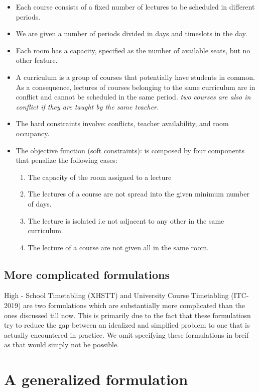 \documentclass[11pt]{book}
\begin{document}
\begin{itemize}

	\item Each course consists of a fixed number of lectures to be scheduled in different periods.
	\item We are given a number of periods divided in days and timeslots in the day. 
	\item Each room has a capacity, specified as the number of available seats, but no other feature. 
	\item A curriculum is a group of courses that potentially have students in common. As a consequence, lectures of courses belonging to the same curriculum are in conflict and cannot be scheduled in the same period. \textit{two courses are also in conflict if they are taught by the same teacher.}
	\item The hard constraints involve: conflicts, teacher availability, and room occupancy. 
	\item The objective function (soft constraints): is composed by four components that penalize the following cases:
		\begin{enumerate}
			\item The capacity of the room assigned to a lecture 
			\item The lectures of a course are not spread into the given minimum number of days. 
			\item The lecture is isolated i.e not adjacent to any  other in the same curriculum. 
			\item The lecture of a course are not given all in the same room.
		\end{enumerate}

\end{itemize}

\subsection{More complicated formulations}
High - School Timetabling (XHSTT) and University Course Timetabling (ITC-2019) are two formulations which are substantially more complicated than the ones discussed till now. This is primarily due to the fact that these formulatiosn try to reduce the gap between an idealized and simplfied problem to one that is actually encountered in practice. We omit specifying these formulations in breif as that would simply not be possible.

\section{A generalized formulation}
\end{document}
